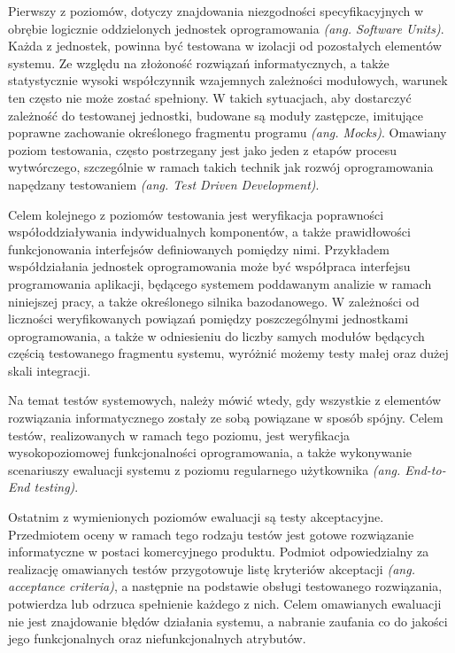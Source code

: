 Pierwszy z poziomów, dotyczy znajdowania niezgodności specyfikacyjnych w obrębie logicznie oddzielonych jednostek oprogramowania \textit{(ang. Software Units)}. Każda z jednostek, powinna być testowana w izolacji od pozostałych elementów systemu. Ze względu na złożoność rozwiązań informatycznych, a także statystycznie wysoki współczynnik wzajemnych zależności modułowych, warunek ten często nie może zostać spełniony. W takich sytuacjach, aby dostarczyć zależność do testowanej jednostki, budowane są moduły zastępcze, imitujące poprawne zachowanie określonego fragmentu programu \textit{(ang. Mocks)}. Omawiany poziom testowania, często postrzegany jest jako jeden z etapów procesu wytwórczego, szczególnie w ramach takich technik jak rozwój oprogramowania napędzany testowaniem \textit{(ang. Test Driven Development)}.

Celem kolejnego z poziomów testowania jest weryfikacja poprawności współoddziaływania indywidualnych komponentów, a także prawidłowości funkcjonowania interfejsów definiowanych pomiędzy nimi. Przykładem współdziałania jednostek oprogramowania może być współpraca interfejsu programowania aplikacji, będącego systemem poddawanym analizie w ramach niniejszej pracy, a także określonego silnika bazodanowego. W zależności od liczności weryfikowanych powiązań pomiędzy poszczególnymi jednostkami oprogramowania, a także w odniesieniu do liczby samych modułów będących częścią testowanego fragmentu systemu, wyróżnić możemy testy małej oraz dużej skali integracji.

Na temat testów systemowych, należy mówić wtedy, gdy wszystkie z elementów rozwiązania informatycznego zostały ze sobą powiązane w sposób spójny. Celem testów, realizowanych w ramach tego poziomu, jest weryfikacja wysokopoziomowej funkcjonalności oprogramowania, a także wykonywanie scenariuszy ewaluacji systemu z poziomu regularnego użytkownika \textit{(ang. End-to-End testing)}.

Ostatnim z wymienionych poziomów ewaluacji są testy akceptacyjne. Przedmiotem oceny w ramach tego rodzaju testów jest gotowe rozwiązanie informatyczne w postaci komercyjnego produktu. Podmiot odpowiedzialny za realizację omawianych testów przygotowuje listę kryteriów akceptacji \textit{(ang. acceptance criteria)}, a następnie na podstawie obsługi testowanego rozwiązania, potwierdza lub odrzuca spełnienie każdego z nich. Celem omawianych ewaluacji nie jest znajdowanie błędów działania systemu, a nabranie zaufania co do jakości jego funkcjonalnych oraz niefunkcjonalnych atrybutów.

